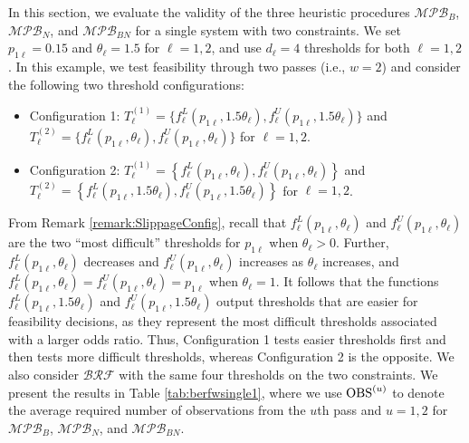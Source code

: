 \documentclass[11pt]{article}
\begin{document}
In this section, we evaluate the validity of the three heuristic procedures $\mathcal{MPB}_B$, $\mathcal{MPB}_N$, and $\mathcal{MPB}_{BN}$ for a single system with two constraints. 
We set $p_{1\ell}=0.15$ and $\theta_\ell=1.5$ for $\ell=1,2$, and use $d_\ell=4$ thresholds for both $\ell=1,2$. In this example, we test feasibility through two passes (i.e., $w=2$) and consider the following two threshold configurations: 
\begin{itemize}
    \item Configuration 1: $T_{\ell}^{(1)} = \{f_\ell^L(p_{1\ell},1.5\theta_\ell), f_\ell^U(p_{1\ell},1.5\theta_\ell)\}$ and $T_{\ell}^{(2)} = \{f_\ell^L(p_{1\ell},\theta_\ell), f_\ell^U(p_{1\ell},\theta_\ell)\}$ for $\ell=1,2$.
    \item Configuration 2: $T_{\ell}^{(1)} = \left\{f_\ell^L(p_{1\ell},\theta_\ell), f_\ell^U(p_{1\ell},\theta_\ell)\right\}$ and $T_{\ell}^{(2)} = \left\{f_\ell^L(p_{1\ell},1.5\theta_\ell), f_\ell^U(p_{1\ell},1.5\theta_\ell)\right\}$ for $\ell=1,2$.
\end{itemize}

From Remark \ref{remark:SlippageConfig}, recall that $f_\ell^L (p_{1\ell}, \theta_\ell)$ and $f_\ell^U (p_{1\ell}, \theta_\ell)$ are the two ``most difficult'' thresholds for $p_{1\ell}$ when $\theta_\ell>0$. Further, $f_\ell^L (p_{1\ell}, \theta_\ell)$ decreases and $f_\ell^U (p_{1\ell}, \theta_\ell)$ increases as $\theta_\ell$ increases, and $f_\ell^L (p_{1\ell}, \theta_\ell)=f_\ell^U (p_{1\ell}, \theta_\ell)=p_{1\ell}$ when $\theta_\ell=1$. 
It follows that the functions $f_\ell^L (p_{1\ell}, 1.5\theta_\ell)$ and $f_\ell^U (p_{1\ell}, 1.5\theta_\ell)$ output thresholds that are easier for feasibility decisions, as they represent the most difficult thresholds associated with a larger odds ratio.
Thus, Configuration 1 tests easier thresholds first and then tests more difficult thresholds, whereas Configuration 2 is the opposite. We also consider $\mathcal{BRF}$ with the same four thresholds on the two constraints. 
We present the results in Table \ref{tab:berfwsingle1}, where we use ${\rm OBS}^{(u)}$ to denote the average required number of observations from the $u$th pass and $u=1,2$ for $\mathcal{MPB}_B$, $\mathcal{MPB}_N$, and $\mathcal{MPB}_{BN}$. 
\end{document}
